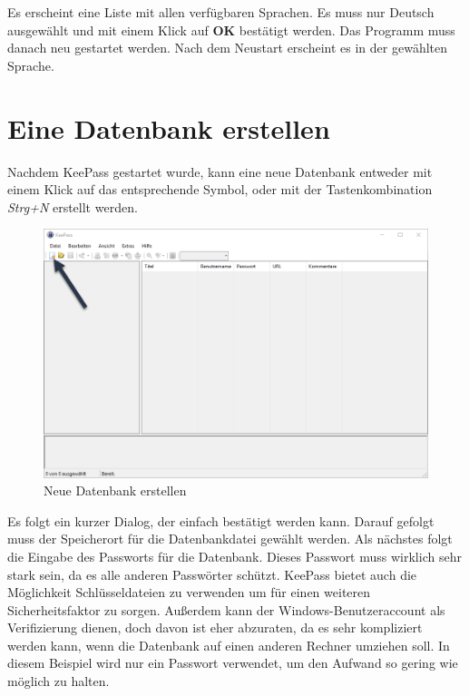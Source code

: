 \documentclass[12pt,a4paper]{scrreprt}
\begin{document}
\noindent Es erscheint eine Liste mit allen verfügbaren Sprachen. Es muss nur Deutsch ausgewählt und mit einem Klick auf \textbf{OK} bestätigt werden. Das Programm muss danach neu gestartet werden. Nach dem Neustart erscheint es in der gewählten Sprache.

\newpage

\section{Eine Datenbank erstellen}
Nachdem KeePass gestartet wurde, kann eine neue Datenbank entweder mit einem Klick auf das entsprechende Symbol, oder mit der Tastenkombination \textit{Strg+N} erstellt werden.

\begin{figure}[h]
\begin{center}
\includegraphics[width=350pt]{media/knewdb1.png}
\caption{Neue Datenbank erstellen}
\label{knewdb1}
\end{center}
\end{figure}

\noindent Es folgt ein kurzer Dialog, der einfach bestätigt werden kann. Darauf gefolgt muss der Speicherort für die Datenbankdatei gewählt werden. Als nächstes folgt die Eingabe des Passworts für die Datenbank. Dieses Passwort muss wirklich sehr stark sein, da es alle anderen Passwörter schützt. KeePass bietet auch die Möglichkeit Schlüsseldateien zu verwenden um für einen weiteren Sicherheitsfaktor zu sorgen. Außerdem kann der Windows-Benutzeraccount als Verifizierung dienen, doch davon ist eher abzuraten, da es sehr kompliziert werden kann, wenn die Datenbank auf einen anderen Rechner umziehen soll. In diesem Beispiel wird nur ein Passwort verwendet, um den Aufwand so gering wie möglich zu halten. \newpage
\end{document}
